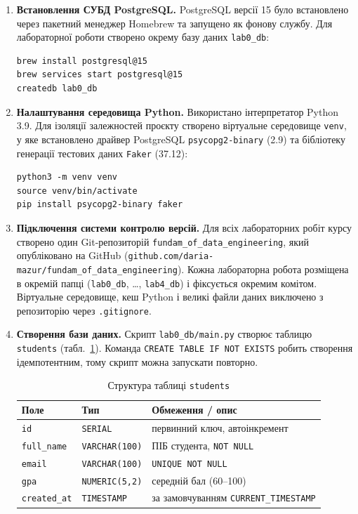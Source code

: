 \begin{enumerate}
  \item \textbf{Встановлення СУБД PostgreSQL.} PostgreSQL версії 15 було встановлено через пакетний менеджер Homebrew та запущено як фонову службу. Для лабораторної роботи створено окрему базу даних \texttt{lab0\_db}:
\begin{Verbatim}
brew install postgresql@15
brew services start postgresql@15
createdb lab0_db
\end{Verbatim}

  \item \textbf{Налаштування середовища Python.} Використано інтерпретатор Python 3.9. Для ізоляції залежностей проєкту створено віртуальне середовище \texttt{venv}, у яке встановлено драйвер PostgreSQL \texttt{psycopg2-binary} (2.9) та бібліотеку генерації тестових даних \texttt{Faker} (37.12):
\begin{Verbatim}
python3 -m venv venv
source venv/bin/activate
pip install psycopg2-binary faker
\end{Verbatim}

  \item \textbf{Підключення системи контролю версій.} Для всіх лабораторних робіт курсу створено один Git-репозиторій \texttt{fundam\_of\_data\_engineering}, який опубліковано на GitHub (\texttt{github.com/daria-mazur/fundam\_of\_data\_engineering}). Кожна лабораторна робота розміщена в окремій папці (\texttt{lab0\_db}, \dots, \texttt{lab4\_db}) і фіксується окремим комітом. Віртуальне середовище, кеш Python і великі файли даних виключено з репозиторію через \texttt{.gitignore}.

  \item \textbf{Створення бази даних.} Скрипт \texttt{lab0\_db/main.py} створює таблицю \texttt{students} (табл.~\ref{tab:students}). Команда \texttt{CREATE TABLE IF NOT EXISTS} робить створення ідемпотентним, тому скрипт можна запускати повторно.

\begin{table}[H]
\centering
\caption{Структура таблиці \texttt{students}}
\label{tab:students}
\begin{tabular}{lll}
\toprule
Поле & Тип & Обмеження / опис \\
\midrule
\texttt{id} & \texttt{SERIAL} & первинний ключ, автоінкремент \\
\texttt{full\_name} & \texttt{VARCHAR(100)} & ПІБ студента, \texttt{NOT NULL} \\
\texttt{email} & \texttt{VARCHAR(100)} & \texttt{UNIQUE NOT NULL} \\
\texttt{gpa} & \texttt{NUMERIC(5,2)} & середній бал (60--100) \\
\texttt{created\_at} & \texttt{TIMESTAMP} & за замовчуванням \texttt{CURRENT\_TIMESTAMP} \\
\bottomrule
\end{tabular}
\end{table}


\end{enumerate}
